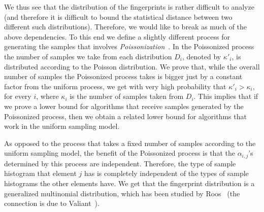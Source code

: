\documentclass[10pt]{article}
\theoremstyle{definition}
\numberwithin{equation}{section}
\newcommand{\w}{\kappa}
\begin{document}
%
%
We thus see that the distribution of the fingerprints is rather difficult to
analyze (and therefore it is difficult
 to bound the statistical distance between two different such distributions).
Therefore, we would like to break as much of the above dependencies.
To this end we %
define a slightly different process for generating
the samples that involves \emph{Poissonization}~\cite{szpankowski}.
In the Poissonized process the number of samples we take from each distribution $D_i$,
denoted by $\w'_i$, is distributed according to the Poisson distribution.
We prove that, while the overall number of samples the Poissonized process
takes is bigger just by a constant factor from the uniform process,
we get with very high probability that $\w'_i > \w_i$, for every $i$,
where $\w_i$ is the number of samples taken from $D_i$.
This implies that if we prove a lower bound for algorithms that receive
samples generated by the Poissonized process, then we obtain a related lower
bound for algorithms that work in the uniform sampling model.

As opposed to the process that takes a fixed number of samples according
to the uniform sampling model, the benefit of the Poissonized process is
that the $\alpha_{i,j}$'s determined by this process are independent.
Therefore, the type of sample histogram that element $j$ has is completely
independent of the types of sample histograms the other elements have.
We get that the fingerprint distribution is a generalized multinomial distribution,
which %
has been studied by Roos~\cite{roos}
(the connection is due to Valiant~\cite{val}).




%
%
%
%
%
%
%
%
%
%
%
%
%
%
\end{document}
